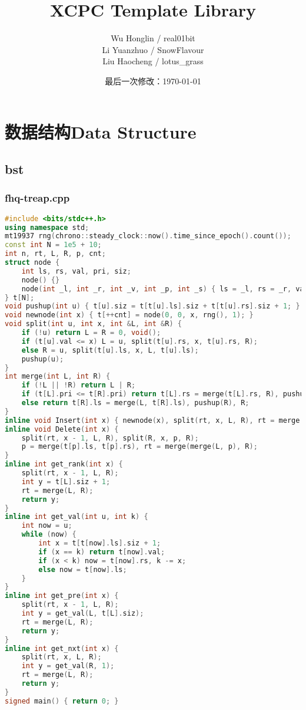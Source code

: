 \documentclass[9pt, a4paper, oneside]{book}
\title{\Huge XCPC Template Library}
\author{
    Wu Honglin / real01bit \\
    Li Yuanzhuo / SnowFlavour \\
    Liu Haocheng / lotus\_grass \\
}
\date{最后一次修改：\today}
\begin{document}
\maketitle
\tableofcontents
\chapter{数据结构Data Structure}
\section{bst}
\subsection{fhq-treap.cpp}
\begin{lstlisting}[language={C++}]
#include <bits/stdc++.h>
using namespace std;
mt19937 rng(chrono::steady_clock::now().time_since_epoch().count());
const int N = 1e5 + 10;
int n, rt, L, R, p, cnt;
struct node {
    int ls, rs, val, pri, siz;
    node() {}
    node(int _l, int _r, int _v, int _p, int _s) { ls = _l, rs = _r, val = _v, pri = _p, siz = _s; }
} t[N];
void pushup(int u) { t[u].siz = t[t[u].ls].siz + t[t[u].rs].siz + 1; }
void newnode(int x) { t[++cnt] = node(0, 0, x, rng(), 1); }
void split(int u, int x, int &L, int &R) {
    if (!u) return L = R = 0, void();
    if (t[u].val <= x) L = u, split(t[u].rs, x, t[u].rs, R);
    else R = u, split(t[u].ls, x, L, t[u].ls);
    pushup(u);
}
int merge(int L, int R) {
    if (!L || !R) return L | R;
    if (t[L].pri <= t[R].pri) return t[L].rs = merge(t[L].rs, R), pushup(L), L;
    else return t[R].ls = merge(L, t[R].ls), pushup(R), R;
}
inline void Insert(int x) { newnode(x), split(rt, x, L, R), rt = merge(merge(L, cnt), R); }
inline void Delete(int x) {
    split(rt, x - 1, L, R), split(R, x, p, R);
    p = merge(t[p].ls, t[p].rs), rt = merge(merge(L, p), R);
}
inline int get_rank(int x) {
    split(rt, x - 1, L, R);
    int y = t[L].siz + 1;
    rt = merge(L, R);
    return y;
}
inline int get_val(int u, int k) {
    int now = u;
    while (now) {
        int x = t[t[now].ls].siz + 1;
        if (x == k) return t[now].val;
        if (x < k) now = t[now].rs, k -= x;
        else now = t[now].ls;
    }
}
inline int get_pre(int x) {
    split(rt, x - 1, L, R);
    int y = get_val(L, t[L].siz);
    rt = merge(L, R);
    return y;
}
inline int get_nxt(int x) {
    split(rt, x, L, R);
    int y = get_val(R, 1);
    rt = merge(L, R);
    return y;
}
signed main() { return 0; }\end{lstlisting}
\end{document}
